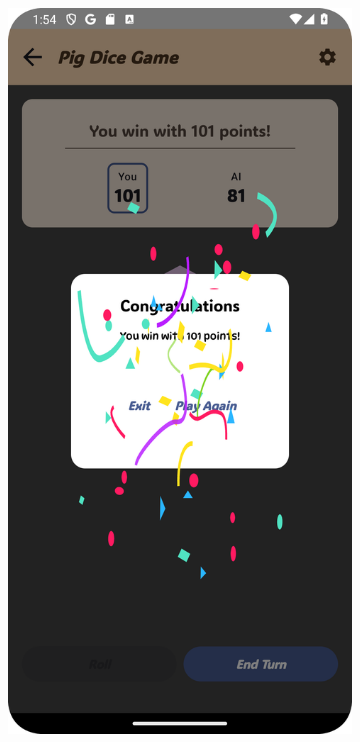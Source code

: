 \begin{figure}[ht!]
    \begin{subfigure}[b]{0.27\textwidth}
        \includegraphics[width=\textwidth]{img/pig board3.png}

\end{subfigure}
\end{figure}
